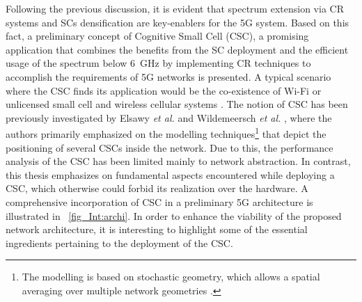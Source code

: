 Following the previous discussion, it is evident that spectrum extension via CR systems and SCs densification are key-enablers for the 5G system.
Based on this fact, a preliminary concept of Cognitive Small Cell (CSC), a promising application that combines the benefits from the SC deployment and the efficient usage of the spectrum below \SI{6}{GHz} by implementing CR techniques to accomplish the requirements of 5G networks is presented. A typical scenario where the CSC finds its application would be the co-existence of Wi-Fi or unlicensed small cell and wireless cellular systems \cite{Benn13, Gali15}. The notion of CSC has been previously investigated by Elsawy \textit{et al.} \cite{Elsawy13, Elsawy13_cmag} and Wildemeersch \textit{et al.} \cite{Wild13}, where the authors primarily emphasized on the modelling techniques\footnote{The modelling is based on stochastic geometry, which allows a spatial averaging over multiple network geometries \cite{Haenggi, Haenggi08now}.} that depict the positioning of several CSCs inside the network. Due to this, the performance analysis of the CSC has been limited mainly to network abstraction. In contrast, this thesis emphasizes on fundamental aspects encountered while deploying a CSC, which otherwise could forbid its realization over the hardware. %
 A comprehensive incorporation of CSC in a preliminary 5G architecture is illustrated in \figurename~\ref{fig_Int:archi}. In order to enhance the viability of the proposed network architecture, it is interesting to highlight some of the essential ingredients pertaining to the deployment of the CSC.

